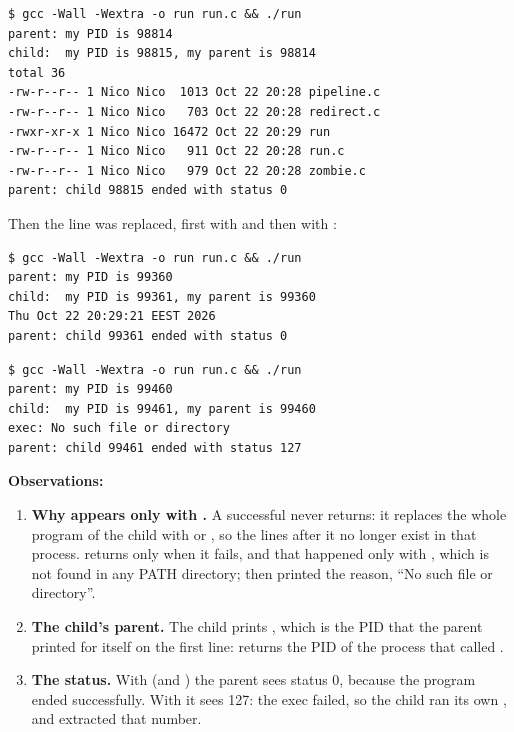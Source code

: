 \documentclass[11pt,a4paper]{article}
\begin{document}
\begin{lstlisting}[caption={run: the child becomes ls -l}]
$ gcc -Wall -Wextra -o run run.c && ./run
parent: my PID is 98814
child:  my PID is 98815, my parent is 98814
total 36
-rw-r--r-- 1 Nico Nico  1013 Oct 22 20:28 pipeline.c
-rw-r--r-- 1 Nico Nico   703 Oct 22 20:28 redirect.c
-rwxr-xr-x 1 Nico Nico 16472 Oct 22 20:29 run
-rw-r--r-- 1 Nico Nico   911 Oct 22 20:28 run.c
-rw-r--r-- 1 Nico Nico   979 Oct 22 20:28 zombie.c
parent: child 98815 ended with status 0
\end{lstlisting}

Then the  line was replaced, first with
 and then with
:

\begin{lstlisting}[caption={The child becomes date}]
$ gcc -Wall -Wextra -o run run.c && ./run
parent: my PID is 99360
child:  my PID is 99361, my parent is 99360
Thu Oct 22 20:29:21 EEST 2026
parent: child 99361 ended with status 0
\end{lstlisting}

\begin{lstlisting}[caption={A program that does not exist}]
$ gcc -Wall -Wextra -o run run.c && ./run
parent: my PID is 99460
child:  my PID is 99461, my parent is 99460
exec: No such file or directory
parent: child 99461 ended with status 127
\end{lstlisting}

\textbf{Observations:}
\begin{enumerate}
  \item \textbf{Why  appears only with .} A successful
   never returns: it replaces the whole program of the child with  or
  , so the lines after it no longer exist in that process.  returns only
  when it fails, and that happened only with , which is not found in any PATH
  directory; then  printed the reason, ``No such file or directory''.
  \item \textbf{The child's parent.} The child prints , which is the
  PID that the parent printed for itself on the first line:  returns the PID of
  the process that called .
  \item \textbf{The status.} With  (and ) the parent sees status 0, because
  the program ended successfully. With  it sees 127: the exec failed, so the
  child ran its own , and  extracted that number.
\end{enumerate}
\end{document}
